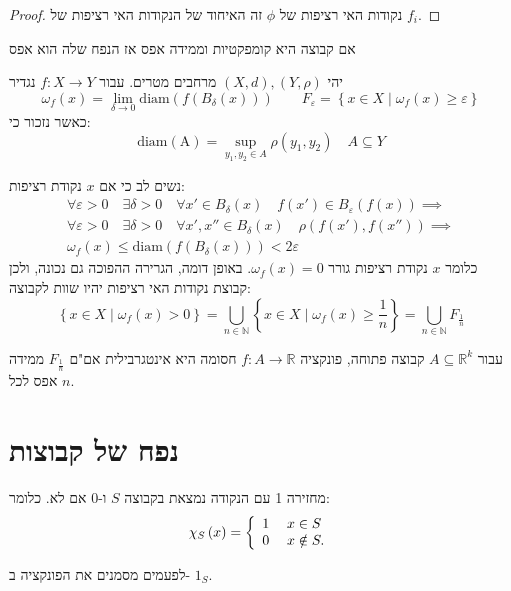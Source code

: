 \documentclass{tstextbook}
\begin{document}
\begin{proof}
נקודות האי רציפות של \(\phi\) זה האיחוד של הנקודות האי רציפות של \(f_{i}\).

\end{proof}
\begin{proposition}
אם קבוצה היא קומפקטיות וממידה אפס אז הנפח שלה הוא אפס

\end{proposition}
\begin{definition}
יהי \((X,d),\left( Y,\rho \right)\) מרחבים מטרים. עבור \(f:X\to Y\) נגדיר 
$$\omega_{f}(x)=\lim_{ \delta \to 0 } \mathrm{diam}\left( f\left( B_{\delta}(x) \right) \right)\qquad F_{\varepsilon}=\left\{ x \in X \mid 
\omega_{f}(x)\geq \varepsilon  \right\}$$
כאשר נזכור כי:
$$\mathrm{diam(A)}=\sup_{y_{1},y_{2}\in A} \rho\left(y_{1},y_{2} \right)\quad A\subseteq Y$$

\end{definition}
נשים לב כי אם \(x\) נקודת רציפות:
\begin{gather*} \forall \varepsilon >0 \quad \exists \delta>0\quad \forall x'\in B_{\delta}(x)\quad f(x')\in B_{\varepsilon}(f(x))\implies  \\\forall\varepsilon>0 \quad \exists \delta>0\quad \forall x',x''\in B_{\delta}(x)\quad \rho(f(x'),f(x''))\implies \\
\omega_{f}(x)\leq \mathrm{diam}\left( f\left( B_{\delta}(x) \right) \right)<2\varepsilon\end{gather*}
כלומר \(x\) נקודת רציפות גורר \(\omega_{f}(x)=0\). באופן דומה, הגרירה ההפוכה גם נכונה, ולכן קבוצת נקודות האי רציפות יהיו שוות לקבוצה:
$$\left\{  x \in X \mid \omega_{f}(x)>0  \right\}=\bigcup_{n\in\mathbb{N}}\left\{  x \in X \mid \omega_{f}(x)\geq \frac{1}{n}  \right\}=\bigcup_{n \in \mathbb{N}}F_{\frac{1}{n}}$$

\begin{proposition}
עבור \(A\subseteq \mathbb{R}^k\) קבוצה פתוחה, פונקציה \(f:A\to\mathbb{R}\) חסומה היא אינטגרבילית אם"ם \(F_{\frac{1}{n}}\) ממידה אפס לכל \(n\).

\end{proposition}
\section{נפח של קבוצות}

\begin{definition}
מחזירה 1 עם הנקודה נמצאת בקבוצה \(S\) ו-0 אם לא. כלומר:
$$\chi_{S}\left(x\right)=\left\{{\begin{array}{l l}{1}&{\;x\in S}\\ {0}&{\;x\notin S.}\end{array}}\right.$$

\end{definition}
לפעמים מסמנים את הפונקציה ב- \(1_{S}\). 
\end{document}
